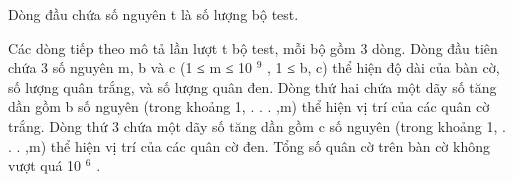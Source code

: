 Dòng đầu chứa số nguyên t là số lượng bộ test.  

   Các dòng tiếp theo mô tả lần lượt t bộ test, mỗi bộ gồm 3 dòng. Dòng đầu tiên chứa 3 số nguyên m, b và c (1 ≤ m ≤ 10   $^    9   $   , 1 ≤ b, c) thể hiện độ dài của bàn cờ, số lượng quân trắng, và số lượng quân đen. Dòng thứ hai chứa một dãy số tăng dần gồm b số nguyên (trong khoảng 1, . . . ,m) thể hiện vị trí của các quân cờ trắng. Dòng thứ 3 chứa một dãy số tăng dần gồm c số nguyên (trong khoảng 1, . . . ,m) thể hiện vị trí của các quân cờ đen. Tổng số quân cờ trên bàn cờ không vượt quá 10   $^    6   $   .